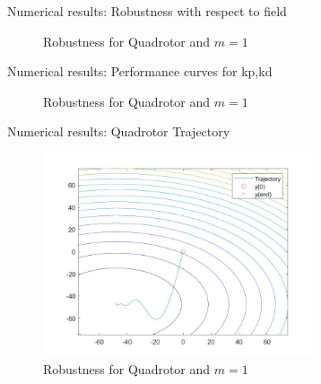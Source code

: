 \documentclass{beamer}
\begin{document}
\begin{frame}{Numerical results: Robustness with respect to field}	
	\begin{figure}[t]
		
		\caption{Robustness for Quadrotor and $m=1$}
		\centering
		\label{fig:quadrotor_robustness}
	\end{figure}
\end{frame}
\begin{frame}{Numerical results: Performance curves for kp,kd}
	\begin{figure}[t]
		
		\caption{Robustness for Quadrotor and $m=1$}
		\centering
		\label{fig:optimal_kd_kp_ratio}
	\end{figure}
\end{frame}
\begin{frame}{Numerical results: Quadrotor Trajectory}	
	\begin{figure}[t]
		\includegraphics[width=8cm]{figures/quadrotor_trajectory.JPG}
		\caption{Robustness for Quadrotor and $m=1$}
		\centering
		\label{fig:quadrotor_trajectory}
	\end{figure}
\end{frame}
\end{document}
